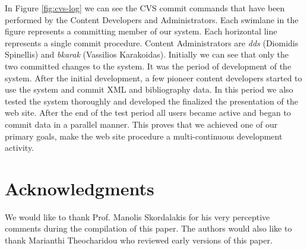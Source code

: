 \documentclass[10pt]{article}
\begin{document}
In Figure \ref{fig:cvs-log} we can see the {\sc CVS} commit commands that have been performed by
the Content Developers and Administrators. Each swimlane in the figure represents a committing
member of our system. Each horizontal line represents a single commit procedure. Content Administrators
are \textit{dds} (Diomidis Spinellis) and \textit{bkarak} (Vassilios Karakoidas). Initially we can see that only the two committed 
changes to the system. It was the period of development of the system. After the initial development, a few 
pioneer content developers started to use the system and commit {\sc XML} and bibliography data. In this period 
we also tested the system thoroughly and developed the finalized the presentation of the web site. After the end of
the test period all users became active and began to commit data in a parallel manner. This proves that we achieved 
one of our primary goals, make the web site procedure a multi-continuous development activity.

\section{Acknowledgments}
\label{sec:ack}

We would like to thank Prof. Manolis Skordalakis for his very perceptive comments during the compilation of this paper.
The authors would also like to thank Marianthi Theocharidou who reviewed early versions 
of this paper.



\end{document}

